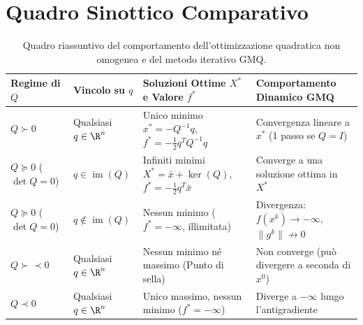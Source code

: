 \FloatBarrier
\section{Quadro Sinottico Comparativo}
\label{sec:quadro-sinottico-ottimizzazione-quadratica}

\begin{table}[H]
\centering
\small
\renewcommand{\arraystretch}{1.35}
\begin{tabularx}{\textwidth}{l >{\raggedright\arraybackslash}p{2.6cm} Y >{\raggedright\arraybackslash}p{3.1cm}}
\toprule
\textbf{Regime di $Q$} & \textbf{Vincolo su $q$} & \textbf{Soluzioni Ottime $X^*$ e Valore $f^*$} & \textbf{Comportamento Dinamico GMQ} \\
\midrule
$Q \succ 0$ & Qualsiasi $q \in \R^n$ & Unico minimo $x^* = -Q^{-1}q$, $f^* = -\frac{1}{2}q^T Q^{-1}q$ & Convergenza lineare a $x^*$ (1 passo se $Q=I$) \\
$Q \succeq 0$ ($\det Q = 0$) & $q \in \operatorname{im}(Q)$ & Infiniti minimi $X^* = \bar{x} + \ker(Q)$, $f^* = -\frac{1}{2}q^T \bar{x}$ & Converge a una soluzione ottima in $X^*$ \\
$Q \succeq 0$ ($\det Q = 0$) & $q \notin \operatorname{im}(Q)$ & Nessun minimo ($f^* = -\infty$, illimitata) & Divergenza: $f(x^k) \to -\infty$, $\|g^k\| \not\to 0$ \\
$Q \succ\prec 0$ & Qualsiasi $q \in \R^n$ & Nessun minimo né massimo (Punto di sella) & Non converge (può divergere a seconda di $x^0$) \\
$Q \prec 0$ & Qualsiasi $q \in \R^n$ & Unico massimo, nessun minimo ($f^* = -\infty$) & Diverge a $-\infty$ lungo l'antigradiente \\
\bottomrule
\end{tabularx}
\caption{Quadro riassuntivo del comportamento dell'ottimizzazione quadratica non omogenea e del metodo iterativo GMQ.}
\label{tab:sinottico-quadratica-gmq}
\end{table}
